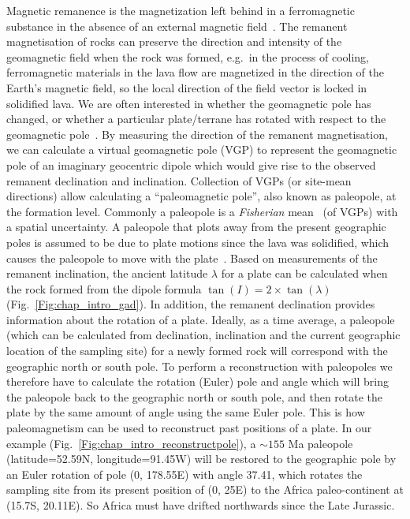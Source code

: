 Magnetic remanence is the magnetization left behind in a ferromagnetic substance
in the absence of an external magnetic field~\citep{T20}. The remanent
magnetisation of rocks can preserve the direction and intensity of the
geomagnetic field when the rock was formed, e.g.\ in the process of cooling,
ferromagnetic materials in the lava flow are magnetized in the direction of the
Earth's magnetic field, so the local direction of the field vector is locked in
solidified lava. We are often interested in whether the geomagnetic pole has
changed, or whether a particular plate/terrane has rotated with respect to the
geomagnetic pole~\citep{T20}. By measuring the direction of the remanent
magnetisation, we can calculate a virtual geomagnetic pole (VGP) to represent
the geomagnetic pole of an imaginary geocentric dipole which would give rise to
the observed remanent declination and inclination. Collection of VGPs (or
site-mean directions) allow calculating a ``paleomagnetic pole'', also known as
paleopole, at the formation level. Commonly a paleopole is a \emph{Fisherian}
mean~\citep{F53} (of VGPs) with a spatial uncertainty. A paleopole that plots
away from the present geographic poles is assumed to be due to plate motions
since the lava was solidified, which causes the paleopole to move with the
plate~\citep{T08}. Based on measurements of the remanent inclination, the
ancient latitude $\lambda$ for a plate can be calculated when the rock formed
from the dipole formula $\tan(I) = 2 \times\tan(\lambda)$
(Fig.~\ref{Fig:chap_intro_gad}). In addition, the remanent declination provides
information about the rotation of a plate. Ideally, as a time average, a
paleopole (which can be calculated from declination, inclination and the current
geographic location of the sampling site) for a newly formed rock will
correspond with the geographic north or south pole. To perform a reconstruction
with paleopoles we therefore have to calculate the rotation (Euler) pole and
angle which will bring the paleopole back to the geographic north or south pole,
and then rotate the plate by the same amount of angle using the same Euler pole.
This is how paleomagnetism can be used to reconstruct past positions of a plate.
In our example (Fig.~\ref{Fig:chap_intro_reconstructpole}), a ${\sim}155$ Ma
paleopole (latitude=52.59\degree{}N, longitude=91.45\degree{}W) will be restored
to the geographic pole by an Euler rotation of pole (0\degree, 178.55\degree{}E)
with angle 37.41\degree, which rotates the sampling site from its present
position of (0\degree, 25\degree{}E) to the Africa paleo-continent at
(15.7\degree{}S, 20.11\degree{}E). So Africa must have drifted northwards since
the Late Jurassic.

